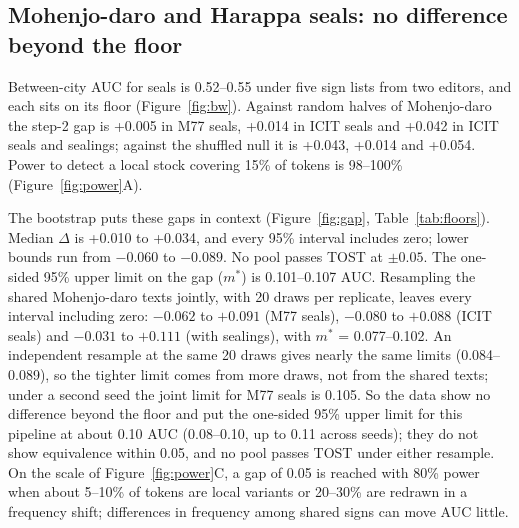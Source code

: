 \documentclass[11pt,a4paper]{article}
\begin{document}
\subsection{Mohenjo-daro and Harappa seals: no difference beyond the floor}
\label{sec:tie}

Between-city AUC for seals is 0.52--0.55 under five sign lists from two editors, and each sits on its floor (Figure~\ref{fig:bw}). %
Against random halves of Mohenjo-daro the step-2 gap is +0.005 in M77 seals, +0.014 in ICIT seals and +0.042 in ICIT seals and sealings; against the shuffled null it is +0.043, +0.014 and +0.054. %
Power to detect a local stock covering 15\% of tokens is 98--100\% (Figure~\ref{fig:power}A). %

The bootstrap puts these gaps in context (Figure~\ref{fig:gap}, Table~\ref{tab:floors}).
Median $\Delta$ is +0.010 to +0.034, and every 95\% interval includes zero; lower bounds run from $-0.060$ to $-0.089$. %
No pool passes TOST at $\pm 0.05$.
The one-sided 95\% upper limit on the gap ($m^*$) is 0.101--0.107 AUC. %
Resampling the shared Mohenjo-daro texts jointly, with 20 draws per replicate, leaves every interval including zero: $-0.062$ to $+0.091$ (M77 seals), $-0.080$ to $+0.088$ (ICIT seals) and $-0.031$ to $+0.111$ (with sealings), with $m^*$ = 0.077--0.102. %
An independent resample at the same 20 draws gives nearly the same limits (0.084--0.089), so the tighter limit comes from more draws, not from the shared texts; under a second seed the joint limit for M77 seals is 0.105. %
So the data show no difference beyond the floor and put the one-sided 95\% upper limit for this pipeline at about 0.10 AUC (0.08--0.10, up to 0.11 across seeds); they do not show equivalence within 0.05, and no pool passes TOST under either resample.
On the scale of Figure~\ref{fig:power}C, a gap of 0.05 is reached with 80\% power when about 5--10\% of tokens are local variants or 20--30\% are redrawn in a frequency shift; differences in frequency among shared signs can move AUC little. %
\end{document}

